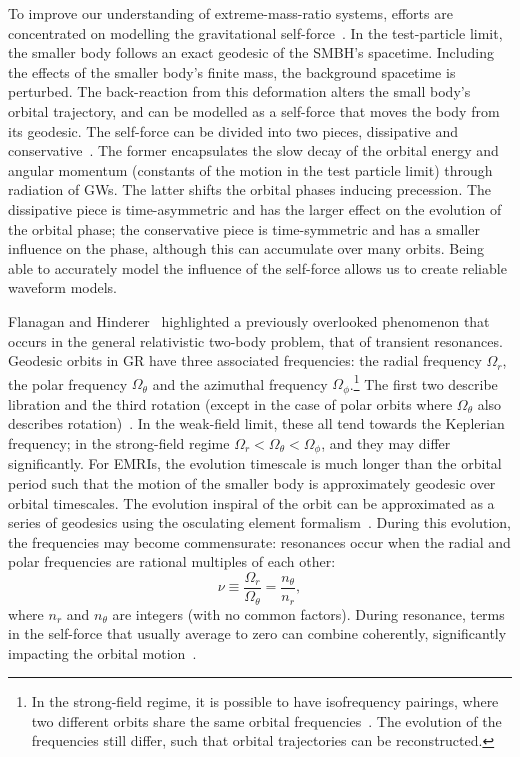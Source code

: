 \documentclass[aps,prd,amsfonts,amssymb,amsmath,nofootinbib,showpacs,superscriptaddress,twocolumn,floatfix]{revtex4-1}
\begin{document}
To improve our understanding of extreme-mass-ratio systems, efforts are concentrated on modelling the gravitational self-force~\cite{Barack2009,Poisson2004,Pound2015}. In the test-particle limit, the smaller body follows an exact geodesic of the SMBH's spacetime. Including the effects of the smaller body's finite mass, the background spacetime is perturbed. The back-reaction from this deformation alters the small body's orbital trajectory, and can be modelled as a self-force that moves the body from its geodesic. The self-force can be divided into two pieces, dissipative and conservative~\cite{Sago2008,Barack2009}. The former encapsulates the slow decay of the orbital energy and angular momentum (constants of the motion in the test particle limit) through radiation of GWs. The latter shifts the orbital phases inducing precession. The dissipative piece is time-asymmetric and has the larger effect on the evolution of the orbital phase; the conservative piece is time-symmetric and has a smaller influence on the phase, although this can accumulate over many orbits. Being able to accurately model the influence of the self-force allows us to create reliable waveform models.

Flanagan and Hinderer~\cite{Flanagan2012} highlighted a previously overlooked phenomenon that occurs in the general relativistic two-body problem, that of transient resonances. Geodesic orbits in GR have three associated frequencies: the radial frequency $\Omega_r$, the polar frequency $\Omega_\theta$ and the azimuthal frequency $\Omega_\phi$.\footnote{In the strong-field regime, it is possible to have isofrequency pairings, where two different orbits share the same orbital frequencies~\cite{Warburton2013}. The evolution of the frequencies still differ, such that orbital trajectories can be reconstructed.} The first two describe libration and the third rotation (except in the case of polar orbits where $\Omega_\theta$ also describes rotation)~\cite{Goldstein2002}. %
In the weak-field limit, these all tend towards the Keplerian frequency; in the strong-field regime $\Omega_r < \Omega_\theta < \Omega_\phi$, and they may differ significantly. For EMRIs, the evolution timescale is much longer than the orbital period such that the motion of the smaller body is approximately geodesic over orbital timescales. The evolution inspiral of the orbit can be approximated as a series of geodesics using the osculating element formalism~\cite{Pound2008,Gair2011a}. During this evolution, the frequencies may become commensurate: resonances occur when the radial and polar frequencies are rational multiples of each other:
\begin{equation}
\nu \equiv \frac{\Omega_r}{\Omega_\theta} = \frac{n_\theta}{n_r},
\end{equation}
where $n_r$ and $n_\theta$ are integers (with no common factors). During resonance, terms in the self-force that usually average to zero can combine coherently, significantly impacting the orbital motion~\cite{Flanagan2012a}.
\end{document}
